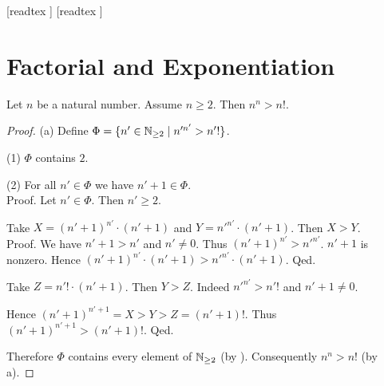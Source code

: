 \documentclass[10pt]{article}
\begin{document}
  \begin{imports}
    \begin{forthel}
      [readtex ]
      [readtex ]
    \end{forthel}
  \end{imports}


  \section*{Factorial and Exponentiation}

  \begin{forthel}
    \begin{proposition}[id=ARITHMETIC_12_8113296594960384,printid]
      Let $n$ be a natural number.
      Assume $n \geq 2$.
      Then $n^{n} > n!$.
    \end{proposition}
    \begin{proof}
      (a) Define $\Phi = \{ n' \in \mathbb{N}_{\geq 2} \mid n'^{n'} > n'! \}$.
  
      (1) $\Phi$ contains $2$.
  
      (2) For all $n' \in \Phi$ we have $n' + 1 \in \Phi$. \\
      Proof.
        Let $n' \in \Phi$.
        Then $n' \geq 2$.
  
        Take $X = (n' + 1)^{n'} \cdot (n' + 1)$ and $Y = n'^{n'} \cdot (n' + 1)$.
        Then $X > Y$. \\
        Proof.
          We have $n' + 1 > n'$ and $n' \neq 0$.
          Thus $(n' + 1)^{n'} > n'^{n'}$.
          $n' + 1$ is nonzero.
          Hence $(n' + 1)^{n'} \cdot (n' + 1) > n'^{n'} \cdot (n' + 1)$.
        Qed.
  
        Take $Z = n'! \cdot (n' + 1)$.
        Then $Y > Z$.
        Indeed $n'^{n'} > n'!$ and $n' + 1 \neq 0$.
  
        Hence $(n' + 1)^{n' + 1} = X > Y > Z = (n' + 1)!$.
        Thus $(n' + 1)^{n' + 1} > (n' + 1)!$.
      Qed.
  
      Therefore $\Phi$ contains every element of $\mathbb{N}_{\geq 2}$ (by ).
      Consequently $n^{n} > n!$ (by a).
    \end{proof}
  \end{forthel}
\end{document}
